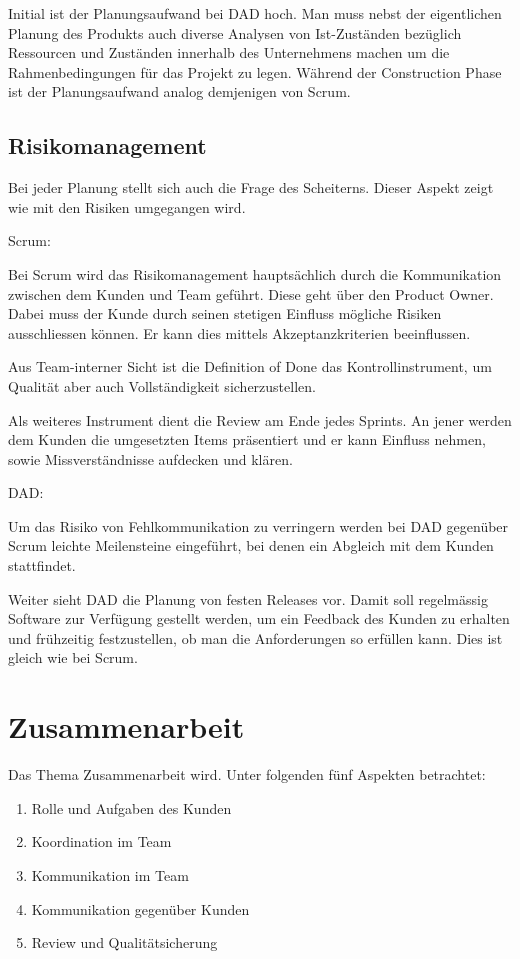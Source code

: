 Initial ist der Planungsaufwand bei DAD hoch. Man muss nebst der eigentlichen Planung des Produkts auch diverse Analysen von Ist-Zuständen bezüglich Ressourcen und Zuständen innerhalb des Unternehmens machen um die Rahmenbedingungen für das Projekt zu legen. Während der Construction Phase ist der Planungsaufwand analog demjenigen von Scrum.


\subsection{Risikomanagement}

Bei jeder Planung stellt sich auch die Frage des Scheiterns. Dieser Aspekt zeigt wie mit den Risiken umgegangen wird.

{\Large Scrum:} \medskip

Bei Scrum wird das Risikomanagement hauptsächlich durch die Kommunikation zwischen dem Kunden und Team geführt. Diese geht über den Product Owner. Dabei muss der Kunde durch seinen stetigen Einfluss mögliche Risiken ausschliessen können. Er kann dies mittels Akzeptanzkriterien beeinflussen.\newline

Aus Team-interner Sicht ist die Definition of Done das Kontrollinstrument, um Qualität aber auch Vollständigkeit sicherzustellen.

Als weiteres Instrument dient die Review am Ende jedes Sprints. An jener werden dem Kunden die umgesetzten Items präsentiert und er kann Einfluss nehmen, sowie Missverständnisse aufdecken und klären.

\bigskip 

{\Large DAD:} \medskip

Um das Risiko von Fehlkommunikation zu verringern werden bei DAD gegenüber Scrum leichte Meilensteine eingeführt, bei denen ein Abgleich mit dem Kunden stattfindet. \medskip

Weiter sieht DAD die Planung von festen Releases vor. Damit soll regelmässig Software zur Verfügung gestellt werden, um ein Feedback des Kunden zu erhalten und frühzeitig festzustellen, ob man die Anforderungen so erfüllen kann. Dies ist gleich wie bei Scrum.

\section{Zusammenarbeit}

Das Thema Zusammenarbeit wird. Unter folgenden fünf Aspekten betrachtet:
\begin{enumerate}
\item Rolle und Aufgaben des Kunden
\item Koordination im Team
\item Kommunikation im Team
\item Kommunikation gegenüber Kunden
\item Review und Qualitätsicherung
\end{enumerate}

